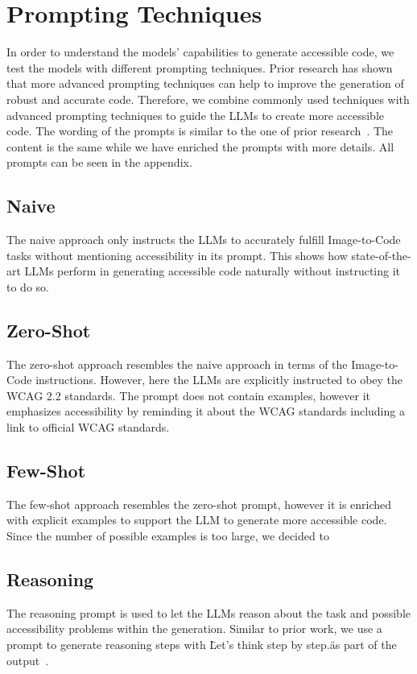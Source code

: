 \section{Prompting Techniques}
In order to understand the models' capabilities to generate accessible code, we test
the models with different prompting techniques. Prior research has shown that more 
advanced prompting techniques can help to improve the generation of robust and 
accurate code. Therefore, we combine commonly used techniques with 
advanced prompting techniques to guide the LLMs to create more accessible code.
The wording of the prompts is similar to the one of prior research~\parencite{suh2025accessiblecode, xiao2024interaction2code}.
The content is the same while we have enriched the prompts with more details.\newline
All prompts can be seen in the appendix.

\subsection{Naive}
The naive approach only instructs the LLMs to accurately fulfill Image-to-Code tasks
without mentioning accessibility in its prompt. This shows how state-of-the-art 
LLMs perform in generating accessible code naturally without instructing it to 
do so.

\subsection{Zero-Shot}
The zero-shot approach resembles the naive approach in terms of the Image-to-Code
instructions. However, here the LLMs are explicitly instructed to obey the WCAG 
2.2 standards. The prompt does not contain examples, however it emphasizes 
accessibility by reminding it about the WCAG standards including a link to 
official WCAG standards.

\subsection{Few-Shot}
The few-shot approach resembles the zero-shot prompt, however it is enriched with 
explicit examples to support the LLM to generate more accessible code.
Since the number of possible examples is too large, we decided to 

\subsection{Reasoning}
The reasoning prompt is used to let the LLMs reason about the task and possible 
accessibility problems within the generation. Similar to prior work, we use 
a prompt to generate reasoning steps with \"Let’s think step by 
step.\" as part of the output~\parencite{chae2024thinkexecute}.

